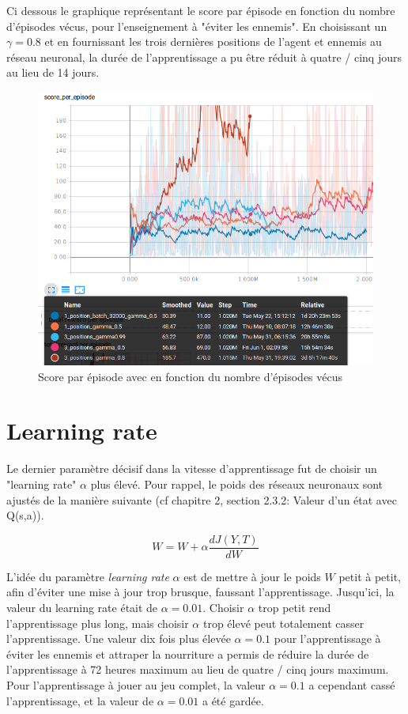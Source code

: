 \documentclass[11pt,a4paper]{report}
\begin{document}
   \newpage
   \par Ci dessous le graphique représentant le score par épisode en fonction du nombre d'épisodes vécus, pour l'enseignement à "éviter les ennemis". En choisissant un $\gamma = 0.8$ et en fournissant les trois dernières positions de l'agent et ennemis au réseau neuronal, la durée de l'apprentissage a pu être réduit à quatre / cinq jours au lieu de 14 jours. 
   
   \begin{figure}[!h]
   \center
   \includegraphics[scale=0.5]{ressources/input_size_gamma.png}
   \caption{Score par épisode avec en fonction du nombre d'épisodes vécus}
   \end{figure} 
   
   \section{Learning rate}
   
   \par Le dernier paramètre décisif dans la vitesse d'apprentissage fut de choisir un "learning rate" $\alpha$ plus élevé. Pour rappel, le poids des réseaux neuronaux sont ajustés de la manière suivante (cf chapitre 2, section 2.3.2: Valeur d’un état avec Q(s,a)). 
   
   $$W = W + \alpha \frac{dJ(Y,T)}{dW}$$
   
   \par L'idée du paramètre \textit{learning rate} $\alpha$ est de mettre à jour le poids $W$ petit à petit, afin d'éviter une mise à jour trop brusque, faussant l'apprentissage. Jusqu'ici, la valeur du learning rate était de $\alpha = 0.01$. Choisir $\alpha$ trop petit rend l'apprentissage plus long, mais choisir $\alpha$ trop élevé peut totalement casser l'apprentissage. Une valeur dix fois plus élevée $\alpha = 0.1$ pour l'apprentissage à éviter les ennemis et attraper la nourriture a permis de réduire la durée de l'apprentissage à 72 heures maximum au lieu de quatre / cinq jours maximum. Pour l'apprentissage à jouer au jeu complet, la valeur $\alpha = 0.1$ a cependant cassé l'apprentissage, et la valeur de $\alpha = 0.01$ a été gardée. 
   
\end{document}
